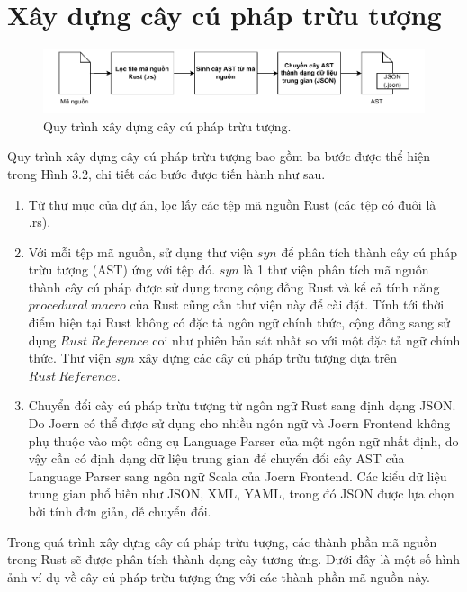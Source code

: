 \section{Xây dựng cây cú pháp trừu tượng}

\begin{figure}[H]
  \includegraphics[width=1\columnwidth]{figures/c3/c3_flow_ast.drawio.pdf}
  \centering
  \caption{Quy trình xây dựng cây cú pháp trừu tượng.}
  \label{img:c3_flow_ast}
\end{figure}

Quy trình xây dựng cây cú pháp trừu tượng bao gồm ba bước được thể hiện trong Hình 3.2, chi tiết các bước được tiến hành như sau.

\begin{enumerate}
  \item Từ thư mục của dự án, lọc lấy các tệp mã nguồn Rust (các tệp có đuôi là .rs).
  \item Với mỗi tệp mã nguồn, sử dụng thư viện $syn$ \cite{synRust} để phân tích thành cây cú pháp trừu tượng (AST) ứng với tệp đó.
  $syn$ là 1 thư viện phân tích mã nguồn thành cây cú pháp được sử dụng trong cộng đồng Rust và kể cả tính năng $procedural\ macro$ \cite{rustlangProceduralMacros} của Rust cũng cần thư viện này để cài đặt.
  Tính tới thời điểm hiện tại Rust không có đặc tả ngôn ngữ chính thức, cộng đồng sang sử dụng $Rust\ Reference$ \cite{rustReference} coi như phiên bản sát nhất so với một đặc tả ngữ chính thức.
  Thư viện $syn$ xây dựng các cây cú pháp trừu tượng dựa trên $Rust\ Reference$.
  \item Chuyển đổi cây cú pháp trừu tượng từ ngôn ngữ Rust sang định dạng JSON.
  Do Joern có thể được sử dụng cho nhiều ngôn ngữ và Joern Frontend không phụ thuộc vào một công cụ Language Parser của một ngôn ngữ nhất định, do vậy cần có định dạng dữ liệu trung gian để chuyển đổi cây AST của Language Parser sang ngôn ngữ Scala của Joern Frontend. Các kiểu dữ liệu trung gian phổ biến như JSON, XML, YAML, trong đó JSON được lựa chọn bởi tính đơn giản, dễ chuyển đổi.
\end{enumerate}

Trong quá trình xây dựng cây cú pháp trừu tượng, các thành phần mã nguồn trong Rust sẽ được phân tích thành dạng cây tương ứng.
Dưới đây là một số hình ảnh ví dụ về cây cú pháp trừu tượng ứng với các thành phần mã nguồn này.

